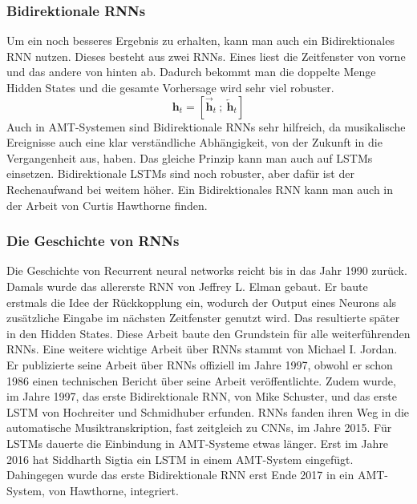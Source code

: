 \subsubsection{Bidirektionale RNNs}
Um ein noch besseres Ergebnis zu erhalten, kann man auch ein Bidirektionales RNN nutzen.
Dieses besteht aus zwei RNNs.
Eines liest die Zeitfenster von vorne und das andere von hinten ab.
Dadurch bekommt man die doppelte Menge Hidden States und die gesamte Vorhersage wird sehr viel robuster.
\[
\mathbf{h}_t = \left[ \overrightarrow{\mathbf{h}}_t \ ;\ \overleftarrow{\mathbf{h}}_t \right]
\]
Auch in AMT-Systemen sind Bidirektionale RNNs sehr hilfreich,
da musikalische Ereignisse auch eine klar verständliche Abhängigkeit, von der Zukunft in die Vergangenheit aus, haben.
Das gleiche Prinzip kann man auch auf LSTMs einsetzen.
Bidirektionale LSTMs sind noch robuster, aber dafür ist der Rechenaufwand bei weitem höher.
Ein Bidirektionales RNN kann man auch in der Arbeit von Curtis Hawthorne finden.
\cite{hawthorne2017onsets}

\subsubsection{Die Geschichte von RNNs}
Die Geschichte von Recurrent neural networks reicht bis in das Jahr 1990 zurück.
Damals wurde das allererste RNN von Jeffrey L. Elman gebaut.
\cite{elman1990finding}
Er baute erstmals die Idee der Rückkopplung ein,
wodurch der Output eines Neurons als zusätzliche Eingabe im nächsten Zeitfenster genutzt wird.
Das resultierte später in den Hidden States.
Diese Arbeit baute den Grundstein für alle weiterführenden RNNs.
Eine weitere wichtige Arbeit über RNNs stammt von Michael I. Jordan.
\cite{jordan1997serial}
Er publizierte seine Arbeit über RNNs offiziell im Jahre 1997,
obwohl er schon 1986 einen technischen Bericht über seine Arbeit veröffentlichte.
Zudem wurde, im Jahre 1997, das erste Bidirektionale RNN, von Mike Schuster,
\cite{schuster1997bidirectional}
und das erste LSTM von Hochreiter und Schmidhuber erfunden.
\cite{hochreiter1997long}
RNNs fanden ihren Weg in die automatische Musiktranskription, fast zeitgleich zu CNNs, im Jahre 2015.
\cite{sigtia2015hybrid}
Für LSTMs dauerte die Einbindung in AMT-Systeme etwas länger.
Erst im Jahre 2016 hat Siddharth Sigtia ein LSTM in einem AMT-System eingefügt.
\cite{sigtia2016end}
Dahingegen wurde das erste Bidirektionale RNN erst Ende 2017 in ein AMT-System, von Hawthorne, integriert.
\cite{hawthorne2017onsets}

